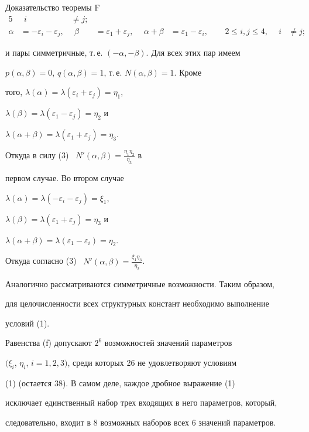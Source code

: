 \begin{pf*}{Доказательство теоремы F}
\begin{alignat*}{5}
&\ \ i&\ne j;\\


%


\alpha&=-\varepsilon_i-\varepsilon_j, &\ \ 


\beta&=\varepsilon_1+\varepsilon_j, & \ \ 


\alpha+\beta&=\varepsilon_1-\varepsilon_i,


& \ \ &2\le i,j\le 4, &\ \ i&\ne j;


\end{alignat*}


и пары симметричные, т.\,е. $(-\alpha,-\beta)$. Для всех этих пар имеем


$p(\alpha,\beta)=0$, $q(\alpha,\beta)=1$, т.\,е. $N(\alpha,\beta)=1$. Кроме


того, $\lambda(\alpha)=\lambda(\varepsilon_i+\varepsilon_j)=\eta_1$,


$\lambda(\beta)=\lambda(\varepsilon_1-\varepsilon_j)=\eta_2$ и


$\lambda(\alpha+\beta)=\lambda(\varepsilon_1+\varepsilon_j)=\eta_3$.


Откуда в силу (3) \ $N'(\alpha,\beta)=\frac{\eta_1\eta_2}{\eta_3}$ в


первом случае. Во втором случае 


$\lambda(\alpha)=\lambda(-\varepsilon_i-\varepsilon_j)=\xi_1$,


$\lambda(\beta)=\lambda(\varepsilon_1+\varepsilon_j)=\eta_3$ и


$\lambda(\alpha+\beta)=\lambda(\varepsilon_1-\varepsilon_i)=\eta_2$.


Откуда согласно (3) \ $N'(\alpha,\beta)=\frac{\xi_1\eta_3}{\eta_2}$.


Аналогично рассматриваются симметричные возможности. Таким образом,


для целочисленности всех структурных констант необходимо выполнение


условий (1).





Равенства (f) допускают $2^6$ возможностей значений параметров


$(\xi_i$, $\eta_i$, $i=1,2,3)$, среди которых 26 не удовлетворяют условиям


(1) (остается 38). В самом деле, каждое дробное выражение (1)


исключает единственный набор трех входящих в него параметров, который,


следовательно, входит в 8 возможных наборов всех 6 значений параметров.



\end{pf*}
